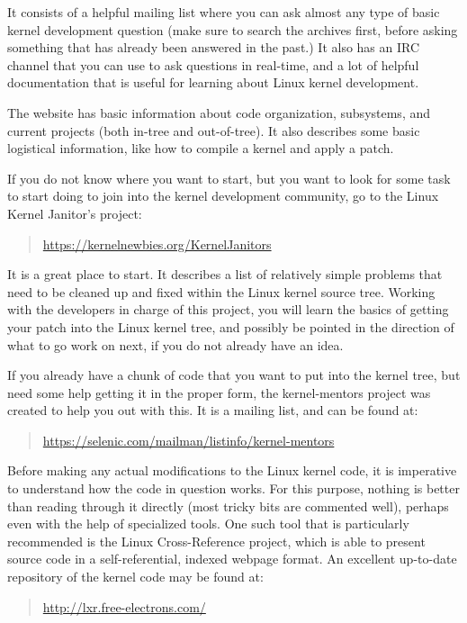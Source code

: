 \documentclass[a4paper,8pt,english]{sphinxmanual}
\begin{document}
It consists of a helpful mailing list where you can ask almost any type
of basic kernel development question (make sure to search the archives
first, before asking something that has already been answered in the
past.)  It also has an IRC channel that you can use to ask questions in
real-time, and a lot of helpful documentation that is useful for
learning about Linux kernel development.

The website has basic information about code organization, subsystems,
and current projects (both in-tree and out-of-tree). It also describes
some basic logistical information, like how to compile a kernel and
apply a patch.

If you do not know where you want to start, but you want to look for
some task to start doing to join into the kernel development community,
go to the Linux Kernel Janitor's project:
\begin{quote}

\href{https://kernelnewbies.org/KernelJanitors}{https://kernelnewbies.org/KernelJanitors}
\end{quote}

It is a great place to start.  It describes a list of relatively simple
problems that need to be cleaned up and fixed within the Linux kernel
source tree.  Working with the developers in charge of this project, you
will learn the basics of getting your patch into the Linux kernel tree,
and possibly be pointed in the direction of what to go work on next, if
you do not already have an idea.

If you already have a chunk of code that you want to put into the kernel
tree, but need some help getting it in the proper form, the
kernel-mentors project was created to help you out with this.  It is a
mailing list, and can be found at:
\begin{quote}

\href{https://selenic.com/mailman/listinfo/kernel-mentors}{https://selenic.com/mailman/listinfo/kernel-mentors}
\end{quote}

Before making any actual modifications to the Linux kernel code, it is
imperative to understand how the code in question works.  For this
purpose, nothing is better than reading through it directly (most tricky
bits are commented well), perhaps even with the help of specialized
tools.  One such tool that is particularly recommended is the Linux
Cross-Reference project, which is able to present source code in a
self-referential, indexed webpage format. An excellent up-to-date
repository of the kernel code may be found at:
\begin{quote}

\href{http://lxr.free-electrons.com/}{http://lxr.free-electrons.com/}
\end{quote}
\end{document}
